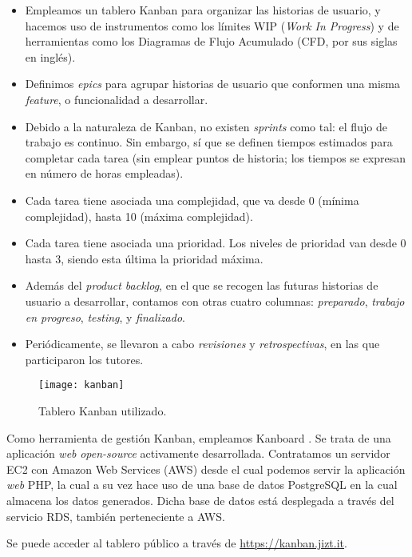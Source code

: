 \begin{itemize}
	\item [\textbullet] Empleamos un tablero Kanban para organizar las historias de usuario, y hacemos uso de instrumentos como los límites WIP (\emph{Work In Progress}) y de herramientas como los Diagramas de Flujo Acumulado (CFD, por sus siglas en inglés).
	\item [\textbullet] Definimos \emph{epics} para agrupar historias de usuario que conformen una misma \emph{feature}, o funcionalidad a desarrollar.
	\item [\textbullet] Debido a la naturaleza de Kanban, no existen \emph{sprints} como tal: el flujo de trabajo es continuo. Sin embargo, sí que se definen tiempos estimados para completar cada tarea (sin emplear puntos de historia; los tiempos se expresan en número de horas empleadas).
	\item [\textbullet] Cada tarea tiene asociada una complejidad, que va desde 0 (mínima complejidad), hasta 10 (máxima complejidad).
	\item [\textbullet] Cada tarea tiene asociada una prioridad. Los niveles de prioridad van desde 0 hasta 3, siendo esta última la prioridad máxima.
	\item [\textbullet] Además del \emph{product backlog}, en el que se recogen las futuras historias de usuario a desarrollar, contamos con otras cuatro columnas: \emph{preparado}, \emph{trabajo en progreso}, \emph{testing}, y \emph{finalizado}.
	\item [\textbullet] Periódicamente, se llevaron a cabo \emph{revisiones} y \emph{retrospectivas}, en las que participaron los tutores.
\end{itemize}

\vspace{-0.2cm}
\begin{figure}[h]
	\centering
	\texttt{[image: kanban]}
	\caption{Tablero Kanban utilizado.}
\end{figure}

Como herramienta de gestión Kanban, empleamos Kanboard \cite{kanboard}. Se trata de una aplicación \emph{web} \emph{open-source} activamente desarrollada. Contratamos un servidor EC2 con Amazon Web Services (AWS) desde el cual podemos servir la aplicación \emph{web} PHP, la cual a su vez hace uso de una base de datos PostgreSQL en la cual almacena los datos generados. Dicha base de datos está desplegada a través del servicio RDS, también perteneciente a AWS.

Se puede acceder al tablero público a través de \href{https://board.jizt.it/public/board/c08ea3322e2876652a0581e79d6430e2dc0c27720d8a06d7853e84c3cd2b}{https://kanban.jizt.it}.

